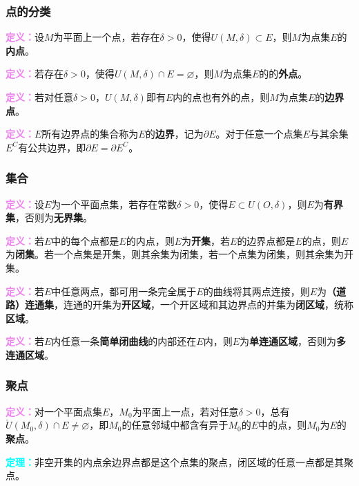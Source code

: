 \documentclass[UTF8, 12pt]{ctexart}
\begin{document}
\subsubsection{点的分类}

\textcolor{violet}{\textbf{定义：}}设$M$为平面上一个点，若存在$\delta>0$，使得$U(M,\delta)\subset E$，则$M$为点集$E$的\textbf{内点}。

\textcolor{violet}{\textbf{定义：}}若存在$\delta>0$，使得$U(M,\delta)\cap E=\varnothing$，则$M$为点集$E$的的\textbf{外点}。

\textcolor{violet}{\textbf{定义：}}若对任意$\delta>0$，$U(M,\delta)$即有$E$内的点也有外的点，则$M$为点集$E$的\textbf{边界点}。

\textcolor{violet}{\textbf{定义：}}$E$所有边界点的集合称为$E$的\textbf{边界}，记为$\partial E$。对于任意一个点集$E$与其余集$E^C$有公共边界，即$\partial E=\partial E^C$。

\subsubsection{集合}

\textcolor{violet}{\textbf{定义：}}设$E$为一个平面点集，若存在常数$\delta>0$，使得$E\subset U(O,\delta)$，则$E$为\textbf{有界集}，否则为\textbf{无界集}。

\textcolor{violet}{\textbf{定义：}}若$E$中的每个点都是$E$的内点，则$E$为\textbf{开集}，若$E$的边界点都是$E$的点，则$E$为\textbf{闭集}。若一个点集是开集，则其余集为闭集，若一个点集为闭集，则其余集为开集。

\textcolor{violet}{\textbf{定义：}}若$E$中任意两点，都可用一条完全属于$E$的曲线将其两点连接，则$E$为\textbf{（道路）连通集}，连通的开集为\textbf{开区域}，一个开区域和其边界点的并集为\textbf{闭区域}，统称\textbf{区域}。

\textcolor{violet}{\textbf{定义：}}若$E$内任意一条\textbf{简单闭曲线}的内部还在$E$内，则$E$为\textbf{单连通区域}，否则为\textbf{多连通区域}。

\subsubsection{聚点}

\textcolor{violet}{\textbf{定义：}}对一个平面点集$E$，$M_0$为平面上一点，若对任意$\delta>0$，总有$\mathring{U}(M_0,\delta)\cap E\neq\varnothing$，即$M_0$的任意邻域中都含有异于$M_0$的$E$中的点，则$M_0$为$E$的\textbf{聚点}。

\textcolor{aqua}{\textbf{定理：}}非空开集的内点余边界点都是这个点集的聚点，闭区域的任意一点都是其聚点。
\end{document}
